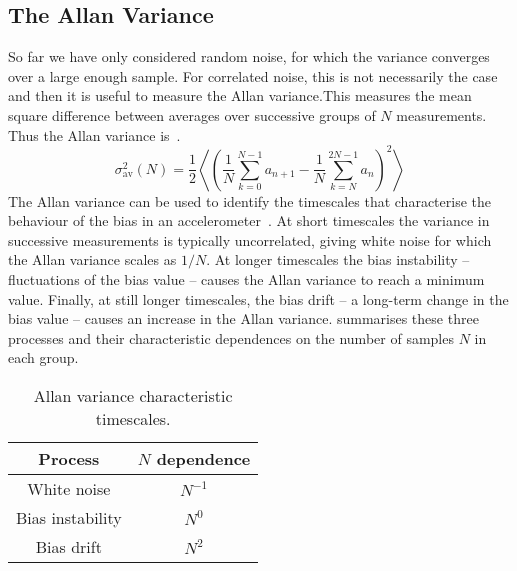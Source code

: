 \subsection{The Allan Variance}\label{subsec:allan_variance}
So far we have only considered random noise, for which the variance
converges over a large enough sample. For correlated noise, this is
not necessarily the case and then it is useful to measure the Allan
variance.This measures the mean square difference between averages
over successive groups of
$N$ measurements. Thus the Allan
variance is~\cite{Allan1966}. 
\begin{equation}
  \sigma_\text{av}^2(N) = \frac{1}{2}
  \left\langle
  \left(\frac{1}{N}\sum_{k=0}^{N-1}a_{n+1}-\frac{1}{N}\sum_{k=N}^{2N-1}a_n\right)^2\right\rangle
  \label{eq:allan_var_mean}
\end{equation}
The Allan variance can be used to identify the timescales that
characterise the behaviour of the bias in an
accelerometer~\cite{El-Sheimy2008}. At short
timescales the variance in successive measurements is typically
uncorrelated, giving white noise for which the Allan variance scales
as $1/N$.
At longer timescales the bias instability -- fluctuations of
the bias value -- causes the Allan variance to reach a minimum value.
Finally, at still longer timescales, the bias drift -- a long-term
change in the bias value -- causes
an increase in the Allan variance.  summarises
these three processes and their characteristic dependences on the
number of samples $N$ in each group.
\begin{table}[htpb]
  \centering
  \begin{tabular}{cc}
  \toprule
    Process & $N$ dependence \\ 
    \midrule
    White noise & $N^{-1}$ \\
    Bias instability & $N^{0}$ \\
    Bias drift & $N^{2}$\\
    \bottomrule
  \end{tabular}
  \caption{Allan variance characteristic timescales.}
  \label{tab:avar}
\end{table}

